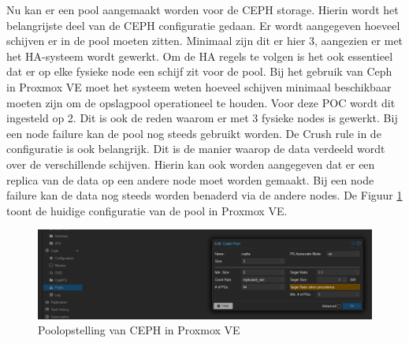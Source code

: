 Nu kan er een pool aangemaakt worden voor de CEPH storage. Hierin wordt het belangrijste deel van de CEPH configuratie gedaan.
Er wordt aangegeven hoeveel schijven er in de pool moeten zitten. Minimaal zijn dit er hier 3, aangezien er met het HA-systeem wordt gewerkt. Om de HA regels te volgen is het ook essentieel dat er op elke fysieke node een schijf zit voor de pool.
Bij het gebruik van Ceph in Proxmox VE moet het systeem weten hoeveel schijven minimaal beschikbaar moeten zijn om de opslagpool operationeel te houden. Voor deze POC wordt dit ingesteld op 2. Dit is ook de reden waarom er met 3 fysieke nodes is gewerkt. Bij een node failure kan de pool nog steeds gebruikt worden.
De Crush rule in de configuratie is ook belangrijk. Dit is de manier waarop de data verdeeld wordt over de verschillende schijven. Hierin kan ook worden aangegeven dat er een replica van de data op een andere node moet worden gemaakt. Bij een node failure kan de data nog steeds worden benaderd via de andere nodes.
De Figuur \ref{fig:ceph-pool-prox} toont de huidige configuratie van de pool in Proxmox VE.
\begin{figure}[H]
  \centering
  \includegraphics[width=\textwidth, trim=10cm 0cm 0cm 0cm, clip]{../poc/ceph-pool-prox.png}
  \caption{Poolopstelling van CEPH in Proxmox VE}
  \label{fig:ceph-pool-prox}
\end{figure}


